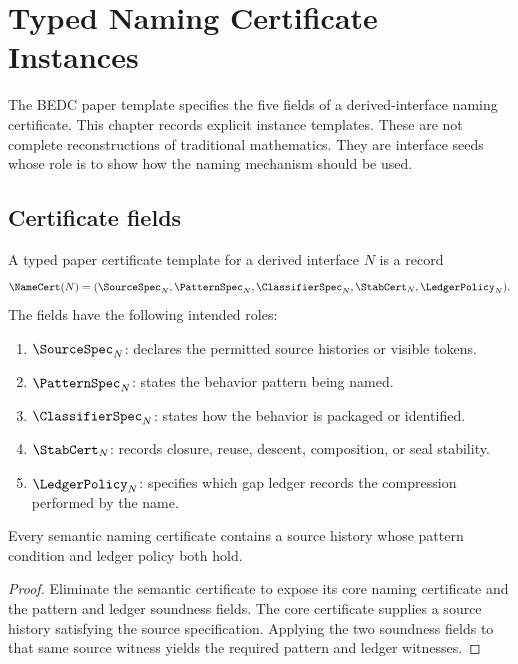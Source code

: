 \chapter{Typed Naming Certificate Instances}
\label{ch:hardening-typed-name-certificate-instances}

The BEDC paper template specifies the five fields of a derived-interface naming certificate. This chapter records explicit instance templates. These are not complete reconstructions of traditional mathematics. They are interface seeds whose role is to show how the naming mechanism should be used.

\section{Certificate fields}

\begin{definition}
\label{def:typed-naming-certificate-expanded-template}
A typed paper certificate template for a derived interface \(N\) is a record
$$
  \NameCert(N)=
  (\SourceSpec_N,\PatternSpec_N,\ClassifierSpec_N,\StabCert_N,\LedgerPolicy_N).
$$
The fields have the following intended roles:
\begin{enumerate}
  \item \(\SourceSpec_N\): declares the permitted source histories or visible tokens.
  \item \(\PatternSpec_N\): states the behavior pattern being named.
  \item \(\ClassifierSpec_N\): states how the behavior is packaged or identified.
  \item \(\StabCert_N\): records closure, reuse, descent, composition, or seal stability.
  \item \(\LedgerPolicy_N\): specifies which gap ledger records the compression performed by the name.
\end{enumerate}
\end{definition}

\begin{theorem}
\label{thm:semantic-namecert-pattern-ledger-witness}
Every semantic naming certificate contains a source history whose pattern
condition and ledger policy both hold.
\end{theorem}
\begin{proof}
Eliminate the semantic certificate to expose its core naming certificate and
the pattern and ledger soundness fields. The core certificate supplies a source
history satisfying the source specification. Applying the two soundness fields
to that same source witness yields the required pattern and ledger witnesses.
\end{proof}


